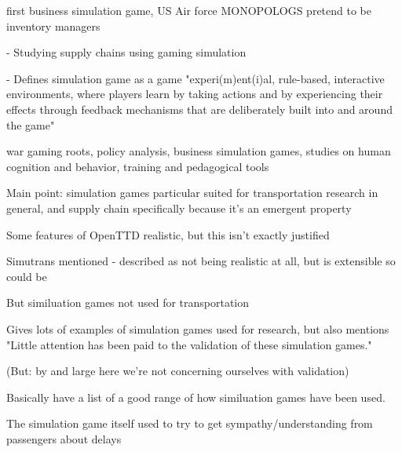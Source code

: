\documentclass[logo,msc,dsti]{infthesis}    %
\begin{document}
\begin{itemize}

\begin{item}
\cite{jackson1959learning} first business simulation game, US Air force MONOPOLOGS pretend to be inventory managers
\end{item}

\begin{item}
\cite{meijer2009organisation} - Studying supply chains using gaming simulation
\end{item}

\begin{item}
\cite{mayer2009gaming} - Defines simulation game as a game "experi(m)ent(i)al, rule-based, interactive environments, where players learn by taking actions and by experiencing their effects through feedback mechanisms that are deliberately built into and around the game"
\end{item}

\begin{item}
\cite{raghothama2013review} war gaming roots, policy analysis, business simulation games, studies on human cognition and behavior, training and pedagogical tools

Main point: simulation games particular suited for transportation research in general, and supply chain specifically because it's an emergent property

Some features of OpenTTD realistic, but this isn't exactly justified

Simutrans mentioned - described as not being realistic at all, but is extensible so could be

But similuation games not used for transportation

Gives lots of examples of simulation games used for research, but also mentions "Little attention has been paid to the validation of these simulation games."

(But: by and large here we're not concerning ourselves with validation)
\end{item}

\begin{item}
Basically have a list of a good range of how similuation games have been used.
\end{item}

\begin{item}
\cite{alderliesten2019maintrain} The simulation game itself used to try to get sympathy/understanding from passengers about delays
\end{item}


\end{itemize}
\end{document}
